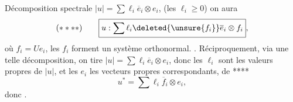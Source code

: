 Décomposition spectrale  $|u|=\sum\ell_i\overline e_i\otimes e_i$, (les $\ell_i\geq0$)
on aura
\[
(****)\qquad\boxed{u:\sum\ell_i\deleted{\unsure{f_i}}\overline e_i\otimes f_i},
\]
où $f_i=Ue_i$, les $f_i$ forment un système orthonormal. 
.
Réciproquement, via une telle décomposition, on tire $|u|=\sum\ell_i\overline e_i\otimes e_i$, donc les $\ell_i$ sont les valeurs propres de $|u|$, et les $e_i$ les vecteurs propres correspondants,  de ****
\[
u^*=\sum\ell_i\overline f_i\otimes e_i,
\]
donc . 
